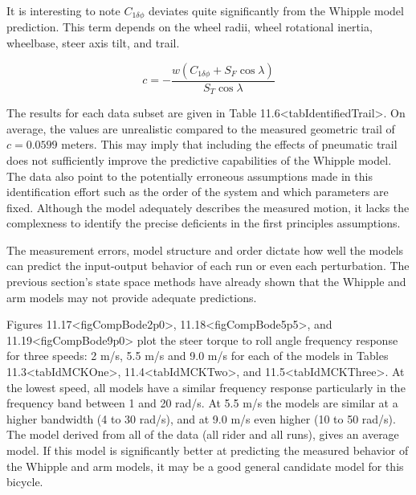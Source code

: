 \documentclass[a4paper]{article}
\begin{document}
It is interesting to note $C_{1 \delta \phi}$ deviates quite
significantly from the Whipple model prediction. This term depends on
the wheel radii, wheel rotational inertia, wheelbase, steer axis tilt,
and trail. 

\[c = -\frac{w(C_{1 \delta \phi} + S_F \operatorname{cos}\lambda)}{S_T
\operatorname{cos}\lambda}\]

The results for each data subset are given in Table
11.6\textless{}tabIdentifiedTrail\textgreater{}. On average, the values
are unrealistic compared to the measured geometric trail
of $c=0.0599$ meters. This may imply that including the effects of
pneumatic trail does not sufficiently improve the predictive
capabilities of the Whipple model. The data also point to the potentially
erroneous assumptions made in this identification effort such as the
order of the system and which parameters are fixed. Although the
model adequately describes the measured motion, it lacks the
complexness to identify the precise deficients in the first principles
assumptions.

The measurement errors, model structure and order dictate how well the
models can predict the input-output behavior of each run or even each
perturbation. The previous section's state space methods have already 
shown that the Whipple and arm models may not provide adequate predictions.

Figures 11.17\textless{}figCompBode2p0\textgreater{},
11.18\textless{}figCompBode5p5\textgreater{}, and
11.19\textless{}figCompBode9p0\textgreater{} plot the steer torque to
roll angle frequency response for three speeds: 2 m/s, 5.5 m/s and 9.0
m/s for each of the models in Tables
11.3\textless{}tabIdMCKOne\textgreater{},
11.4\textless{}tabIdMCKTwo\textgreater{}, and
11.5\textless{}tabIdMCKThree\textgreater{}. At the lowest speed, all models 
have a similar frequency response particularly in the
frequency band between 1 and 20 rad/s. At 5.5 m/s the models are
similar at a higher bandwidth (4 to 30 rad/s), and at 9.0 m/s even
higher (10 to 50 rad/s). The model derived from all of the data (all rider and all runs), gives an
average model. If this model is significantly better at predicting
the measured behavior of the Whipple and arm models, it may be a good
general candidate model for this bicycle.


\end{document}
